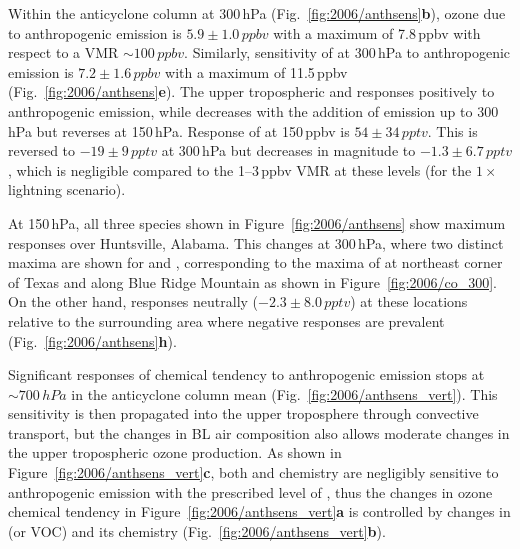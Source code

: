 
Within the anticyclone column at 300\,\unit{hPa} (Fig.~\ref{fig:2006/anthsens}{\bf b}), ozone due to anthropogenic emission
is $5.9\pm1.0\,\unit{ppbv}$ with a maximum of 7.8\,\unit{ppbv} with respect to a VMR $\sim100\,\unit{ppbv}$. Similarly,
sensitivity of  at 300\,\unit{hPa} to anthropogenic emission is $7.2\pm1.6\,\unit{ppbv}$ with a maximum of
11.5\,\unit{ppbv} (Fig.~\ref{fig:2006/anthsens}{\bf e}). The upper tropospheric  and  responses
positively to anthropogenic emission, while  decreases with the addition of emission up to 300\,\unit{hPa}
but reverses at 150\,\unit{hPa}. Response of  at 150\,\unit{ppbv} is $54\pm34\,\unit{pptv}$. This is reversed
to $-19\pm9\,\unit{pptv}$ at 300\,\unit{hPa} but decreases in magnitude to $-1.3\pm6.7\,\unit{pptv}$, which is negligible
compared to the 1--3\,\unit{ppbv} VMR at these levels (for the $1\times$ lightning scenario).

At 150\,\unit{hPa}, all three species shown in Figure~\ref{fig:2006/anthsens} show maximum responses over Huntsville,
Alabama. This changes at 300\,\unit{hPa}, where two distinct maxima are shown for  and ,
corresponding to the maxima of  at northeast corner of Texas and along Blue Ridge Mountain as shown in
Figure~\ref{fig:2006/co_300}. On the other hand,  responses neutrally ($-2.3\pm8.0\,\unit{pptv}$) at
these locations relative to the surrounding area where negative responses are prevalent (Fig.~\ref{fig:2006/anthsens}{\bf h}).

Significant responses of chemical tendency to anthropogenic emission stops at $\sim700\,\unit{hPa}$ in the anticyclone
column mean (Fig.~\ref{fig:2006/anthsens_vert}). This sensitivity is then propagated into the upper troposphere through
convective transport, but the changes in BL air composition also allows moderate changes in the upper tropospheric
ozone production. As shown in Figure~\ref{fig:2006/anthsens_vert}{\bf c}, both  and  chemistry
are negligibly sensitive to anthropogenic emission with the prescribed level of {\lnox}, thus the changes in ozone chemical
tendency in Figure~\ref{fig:2006/anthsens_vert}{\bf a} is controlled by changes in  (or VOC) and its chemistry
(Fig.~\ref{fig:2006/anthsens_vert}{\bf b}).

